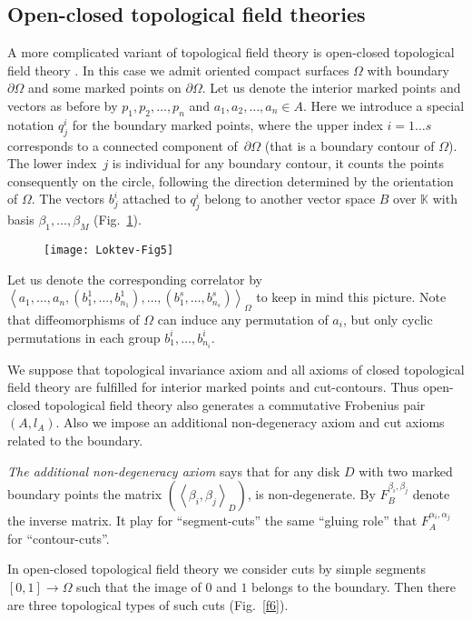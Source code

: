 \documentclass[pdftex]{sigma}
\def \lc {\left<}
\def \rc {\right>}
\def \bou {\partial \Omega}
\begin{document}
\subsection{Open-closed topological f\/ield theories}

A more complicated variant
of topological f\/ield theory is open-closed topological f\/ield theory
\cite{AN,Laz,Moore,MS}. In this case we admit
oriented
compact surfaces $\Omega$  with boundary $\bou$ and some
marked points on $\bou$.
Let us denote the interior marked points and vectors
as before by $p_1,p_2,\dots ,p_n$ and $a_1,a_2,\dots ,a_n\in A$.
Here we introduce a special notation $q^i_j$ for the boundary marked points, where
the upper index $i=1\dots s$ corresponds to a connected component of~$\bou$ (that is a boundary
contour of $\Omega$). The lower index~$j$ is individual for any
boundary contour, it counts the points consequently on the circle,
following the direction determined by the orientation of $\Omega$.
The
vectors $b^i_j$ attached to $q^i_j$
belong to another vector space $B$ over $\mathbb{K}$ with basis $\beta_1, \dots, \beta_M$
(Fig.~\ref{f5}).


\begin{figure}[tbph]
\centering
\texttt{[image: Loktev-Fig5]}
\caption{}\label{f5}
\end{figure}


Let us denote the corresponding correlator
by  $\lc a_1, \dots, a_n, (b_1^1, \dots, b_{n_1}^1), \dots, (b^s_1, \dots,b^s_{n_s}) \rc_\Omega$
to  keep in mind this picture.
Note that dif\/feomorphisms of $\Omega$ can induce any permutation of $a_i$, but only cyclic
permutations in each group $b_1^i, \dots, b_{n_i}^i$.


We suppose that topological invariance axiom and all axioms of
closed topological f\/ield theory are fulf\/illed for interior marked
points and cut-contours. Thus open-closed topological f\/ield theory
also generates a commutative Frobenius pair $(A, l_A)$. Also we impose
an additional non-degeneracy axiom
and cut axioms related to the boundary.

\textit{The additional non-degeneracy axiom} says that
for any disk  $D$  with two marked boundary points
the matrix $\left( \lc \beta_i,\beta_j\rc_{D} \right)$,
is non-degenerate.
By $F^{\beta_i,\beta_j}_B$  denote the inverse matrix.
It play for ``segment-cuts'' the same ``gluing
role'' that $F^{\alpha_i,\alpha_j}_A$ for ``contour-cuts''.

In open-closed topological f\/ield theory we consider cuts by
simple segments $[0,1] \to \Omega$ such that the image of
$0$ and $1$ belongs to the boundary.
Then there are three topological types of such cuts (Fig.~\ref{f6}).
\end{document}
